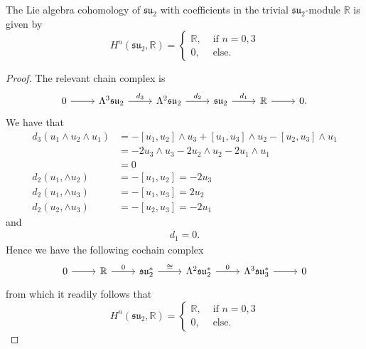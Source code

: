 \begin{proposition}
  The Lie algebra cohomology of $ \mathfrak{su}_2 $ with coefficients in the trivial $ \mathfrak{su}_2 $-module $ \mathbb{R} $ is given by
  \begin{equation}
    H^n(\mathfrak{su}_2, \mathbb{R}) = \begin{cases}
      \mathbb{R}, &\text{ if } n = 0, 3\\
      0, &\text{ else.}
    \end{cases}
  \end{equation}
\end{proposition}
\begin{proof}
  The relevant chain complex is
  \[\begin{tikzcd}
	  0 & {\Lambda^3\mathfrak{su}_2} & {\Lambda^2\mathfrak{su}_2} & {\mathfrak{su}_2} & {\mathbb{R}} & 0.
	  \arrow[from=1-1, to=1-2]
	  \arrow["{d_2}", from=1-3, to=1-4]
	  \arrow["{d_1}", from=1-4, to=1-5]
	  \arrow["{d_3}", from=1-2, to=1-3]
	  \arrow[from=1-5, to=1-6]
  \end{tikzcd}\]
  We have that
  \begin{align*}
    d_3(u_1 \wedge u_2 \wedge u_1) &= -[u_1, u_2] \wedge u_3 + [u_1, u_3]\wedge u_2 - [u_2, u_3] \wedge u_1 \\
                                   &= -2u_3\wedge u_3 - 2u_2\wedge u_2 - 2u_1\wedge u_1 \\
                                   &= 0 \\
    d_2(u_1, \wedge u_2) &= -[u_1, u_2] = -2u_3 \\
    d_2(u_1, \wedge u_3) &= -[u_1, u_3] = 2u_2 \\
    d_2(u_2, \wedge u_3) &= -[u_2, u_3] = -2u_1
  \end{align*}
  and
  \begin{align*}
  d_1 = 0
  .\end{align*}
  Hence we have the following cochain complex
  \[\begin{tikzcd}
	  0 & {\mathbb{R}} & {\mathfrak{su}_2^*} & {\Lambda^2\mathfrak{su}_2^*} & {\Lambda^3\mathfrak{su}_3^*} & 0
	  \arrow[from=1-1, to=1-2]
	  \arrow["0", from=1-2, to=1-3]
	  \arrow["\cong", from=1-3, to=1-4]
	  \arrow["0", from=1-4, to=1-5]
	  \arrow[from=1-5, to=1-6]
  \end{tikzcd}\]
  from which it readily follows that
  \begin{equation}
    H^{n}(\mathfrak{su}_2, \mathbb{R}) = \begin{cases}
      \mathbb{R}, &\text{ if }n = 0,3\\
      0, &\text{ else.}
    \end{cases}
  \end{equation}
\end{proof}


